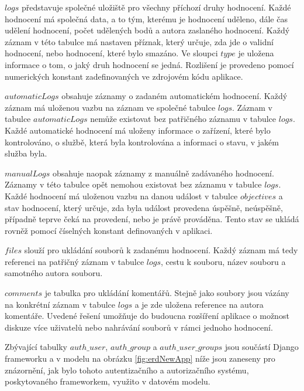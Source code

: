 \documentclass[
  digital, %
  twoside, %
  table,   %
  nolof,     %
  nolot,     %
]{fithesis3}
\begin{document}
$logs$ představuje společné uložiště pro všechny příchozí druhy hodnocení. Každé hodnocení má společná data, a to tým, kterému je hodnocení uděleno, dále čas udělení hodnocení, počet udělených bodů a autora zaslaného hodnocení. Každý záznam v této tabulce má nastaven příznak, který určuje, zda jde o validní hodnocení, nebo hodnocení, které bylo smazáno. Ve sloupci $type$ je uložena informace o tom, o jaký druh hodnocení se jedná. Rozlišení je provedeno pomocí numerických konstant zadefinovaných ve zdrojovém kódu aplikace.

$automaticLogs$ obsahuje záznamy o zadaném automatickém hodnocení. Každý záznam má uloženou vazbu na záznam ve společné tabulce $logs$. Záznam v tabulce $automaticLogs$ nemůže existovat bez patřičného záznamu v tabulce $logs$. Každé automatické hodnocení má uloženy informace o zařízení, které bylo kontrolováno, o službě, která byla kontrolována a informaci o stavu, v jakém služba byla.

$manualLogs$ obsahuje naopak záznamy z manuálně zadávaného hodnocení. Záznamy v této tabulce opět nemohou existovat bez záznamu v tabulce $logs$. Každé hodnocení má uloženou vazbu na danou událost v tabulce $objectives$ a stav hodnocení, který určuje, zda byla událost provedena úspěšně, neúspěšně, případně  teprve čeká na provedení, nebo je právě prováděna. Tento stav se ukládá rovněž pomocí číselných konstant definovaných v aplikaci.

$files$ slouží pro ukládání souborů k zadanému hodnocení. Každý záznam má tedy referenci na patřičný záznam v tabulce $logs$, cestu k souboru, název souboru a samotného autora souboru.

$comments$ je tabulka pro ukládání komentářů. Stejně jako soubory jsou vázány na konkrétní záznam v tabulce $logs$ a je zde uložena reference na autora komentáře. Uvedené řešení umožňuje do budoucna rozšíření aplikace o možnost diskuze více uživatelů nebo nahrávání souborů v rámci jednoho hodnocení.

Zbývající tabulky $auth\_user$, $auth\_group$ a $auth\_user\_groups$ jsou součástí Django frameworku a v modelu na obrázku \ref{fig:erdNewApp} níže jsou zaneseny pro znázornění, jak bylo tohoto autentizačního a autorizačního systému, poskytovaného frameworkem, využito v datovém modelu.
\end{document}
